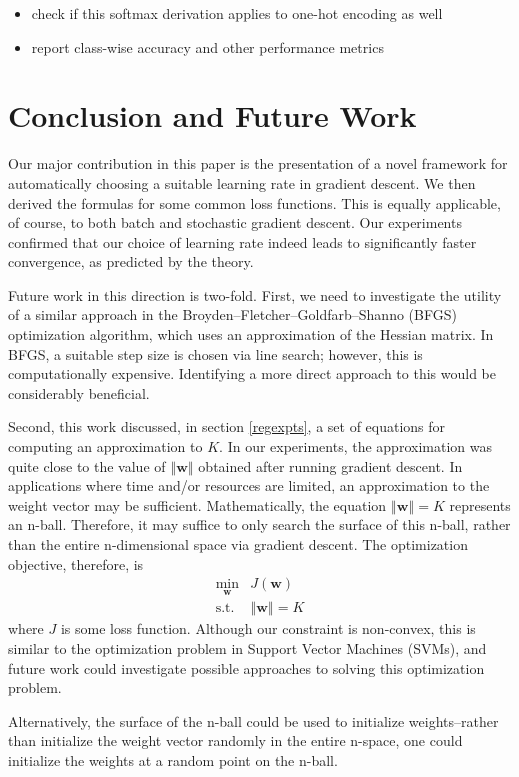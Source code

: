 \documentclass{article}
\begin{document}
\begin{itemize}
    \item check if this softmax derivation applies to one-hot encoding as well
    \item report class-wise accuracy and other performance metrics
\end{itemize}

\section{Conclusion and Future Work}
Our major contribution in this paper is the presentation of a novel framework for automatically choosing a suitable learning rate in gradient descent. We then derived the formulas for some common loss functions. This is equally applicable, of course, to both batch and stochastic gradient descent. Our experiments confirmed that our choice of learning rate indeed leads to significantly faster convergence, as predicted by the theory.

Future work in this direction is two-fold. First, we need to investigate the utility of a similar approach in the Broyden–Fletcher–Goldfarb–Shanno (BFGS)\cite{broyden1970convergence}\cite{fletcher1970new}\cite{goldfarb1970family}\cite{shanno1970conditioning} optimization algorithm, which uses an approximation of the Hessian matrix. In BFGS, a suitable step size is chosen via line search; however, this is computationally expensive. Identifying a more direct approach to this would be considerably beneficial.

Second, this work discussed, in section \ref{regexpts}, a set of equations for computing an approximation to $K$. In our experiments, the approximation was quite close to the value of $\left\Vert \textbf{w} \right\Vert$ obtained after running gradient descent. In applications where time and/or resources are limited, an approximation to the weight vector may be sufficient. Mathematically, the equation $\left\Vert \textbf{w} \right\Vert = K$ represents an n-ball. Therefore, it may suffice to only search the surface of this n-ball, rather than the entire n-dimensional space via gradient descent. The optimization objective, therefore, is
\[
    \begin{aligned}
        \min\limits_{\textbf{w}} & J(\textbf{w}) \\
        \text{s.t. } & \left\Vert \textbf{w} \right\Vert = K 
    \end{aligned}
\]
where $J$ is some loss function. Although our constraint is non-convex, this is similar to the optimization problem in Support Vector Machines (SVMs), and future work could investigate possible approaches to solving this optimization problem.

Alternatively, the surface of the n-ball could be used to initialize weights--rather than initialize the weight vector randomly in the entire n-space, one could initialize the weights at a random point on the n-ball.



\end{document}
